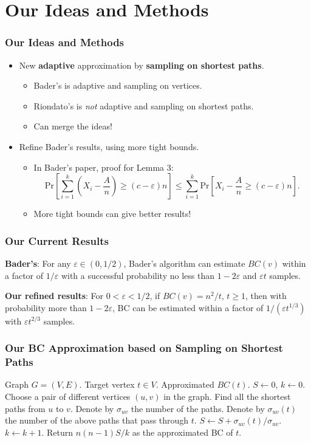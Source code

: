 \documentclass[12pt]{beamer}
\begin{document}
\section{Our Ideas and Methods}
\begin{frame}
	\frametitle{Our Ideas and Methods}
	\begin{itemize}
	\item New {\bf adaptive} approximation by {\bf sampling on shortest paths}.
		\begin{itemize}
		\item Bader's is adaptive and sampling on vertices.
		\item Riondato's is {\it not} adaptive and sampling on shortest paths.
		\item Can merge the ideas!
		\end{itemize}
	\item Refine Bader's results, using more tight bounds.
		\begin{itemize}
			\item In Bader's paper, proof for Lemma 3: $$\mathrm{Pr} [\sum_{i=1}^k \left( X_i - \frac{A}{n} \right) \geq (c-\varepsilon)n] \leq \sum_{i=1}^k\mathrm{Pr}[X_i - \frac{A}{n} \geq (c-\varepsilon)n]. $$
			\item More tight bounds can give better results!
		\end{itemize}
	\end{itemize}
\end{frame}

\begin{frame}
	\frametitle{Our Current Results}
	{\bf Bader's}: For any $\varepsilon \in (0,1/2)$, Bader's algorithm can estimate $BC(v)$ within a factor of $1/\varepsilon$ with a successful probability no less than $1-2\varepsilon$ and $\varepsilon t$ samples.
	
	{\bf Our refined results}: For $0<\varepsilon < 1/2$, if $BC(v) =  n^2/t$, $t\geq 1$, then with probability more than $1-2\varepsilon$, BC can be estimated within a factor of $1/(\varepsilon t^{1/3})$ with $\varepsilon t^{2/3}$ samples.
\end{frame}

\begin{frame}
	\frametitle{Our BC Approximation based on Sampling on Shortest Paths}
	
	\begin{algorithmic}
	\Require Graph $G=(V, E)$. Target vertex $t\in V$.
	\Ensure Approximated $BC(t)$.
	\State $S \gets 0$, $k \gets 0$.
		\State Choose a pair of different vertices $(u, v)$ in the graph.
		\State Find all the shortest paths from $u$ to $v$. Denote by $\sigma_{uv}$ the number of the paths.
		\State Denote by $\sigma_{uv}(t)$ the number of the above paths that pass through $t$.
		\State $S \gets S + \sigma_{uv}(t)/\sigma_{uv}$.
		\State $k \gets k+1$.
	\EndWhile
	\State Return $n(n-1)S/k$ as the approximated BC of $t$.
	\end{algorithmic}
	
\end{frame}
\end{document}
